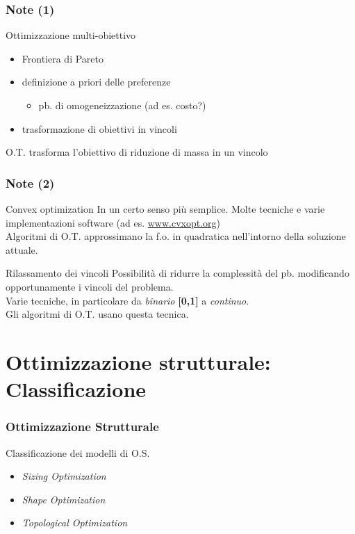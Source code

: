 \documentclass{beamer}
\begin{document}

\begin{frame}
	\frametitle{Note (1)}
	\begin{block}{Ottimizzazione multi-obiettivo}
		\begin{itemize}
			\item Frontiera di Pareto
			\item definizione a priori delle preferenze
			\begin{itemize}
				\item pb. di omogeneizzazione (ad es. costo?)
			\end{itemize}
			\item trasformazione di obiettivi in vincoli
		\end{itemize}
		O.T. trasforma l'obiettivo di riduzione di massa in un vincolo
	\end{block}
\end{frame}

\begin{frame}
	\frametitle{Note (2)}
	
	\begin{block}{Convex optimization}
		In un certo senso pi\`{u} semplice. Molte tecniche e varie implementazioni software (ad es. \url{www.cvxopt.org})\\
		Algoritmi di O.T. approssimano la f.o. in quadratica nell'intorno della soluzione attuale. 
	\end{block}

	\begin{block}{Rilassamento dei vincoli}
		Possibilit\`{a} di ridurre la complessit\`{a} del pb. modificando opportunamente i vincoli del problema.\\
		Varie tecniche, in particolare da \textit{binario} \textbf{[0,1]} a \textit{continuo}.\\
		Gli algoritmi di O.T. usano questa tecnica.
	\end{block}
\end{frame}


\section{Ottimizzazione strutturale: Classificazione}


\begin{frame}
	\frametitle{Ottimizzazione Strutturale}
	Classificazione dei modelli di O.S.\cite{christensen2008introduction}
	\\
	\begin{itemize}
		\item \textit{Sizing Optimization}
		\item \textit{Shape Optimization}
		\item \textit{Topological Optimization}
	\end{itemize}
\end{frame}
\end{document}
